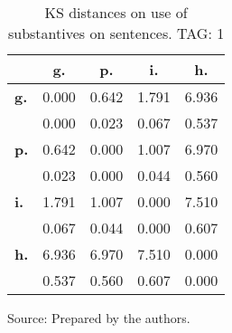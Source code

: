 \begin{table}[h!]
\begin{center}
\caption{KS distances on use of substantives on sentences. TAG: 1}
	\label{tab:kolSub}
\begin{tabular}{| l || c | c | c | c |}\hline
 & {\bf g.} & {\bf p.} & {\bf i.} & {\bf h.} \\\hline\hline
{\bf g.} & 0.000 & 0.642 & 1.791 & 6.936 \\
{\bf } & 0.000 & 0.023 & 0.067 & 0.537 \\\hline
{\bf p.} & 0.642 & 0.000 & 1.007 & 6.970 \\
{\bf } & 0.023 & 0.000 & 0.044 & 0.560 \\\hline
{\bf i.} & 1.791 & 1.007 & 0.000 & 7.510 \\
{\bf } & 0.067 & 0.044 & 0.000 & 0.607 \\\hline
{\bf h.} & 6.936 & 6.970 & 7.510 & 0.000 \\
{\bf } & 0.537 & 0.560 & 0.607 & 0.000 \\\hline
\end{tabular}
\end{center}
\begin{flushleft}
		Source: Prepared by the authors.\
\end{flushleft}
\end{table}
